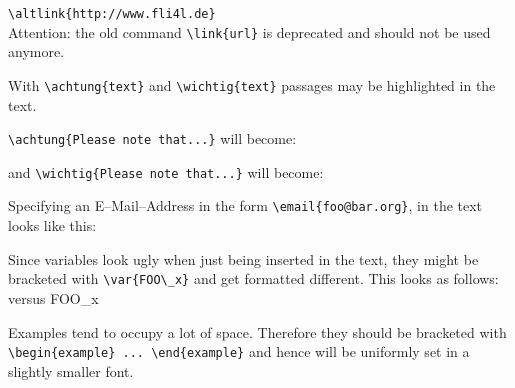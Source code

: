 \begin{description}
  \verb*?\altlink{http://www.fli4l.de}?\\
  Attention: the old command \verb*?\link{url}? is deprecated and
  should not be used anymore.

\item [achtung, wichtig] With \verb*?\achtung{text}? and
  \verb*?\wichtig{text}? passages may be highlighted in the text.

  \verb*?\achtung{Please note that...}? will become:


  and \verb*?\wichtig{Please note that...}? will become:


\item [email] Specifying an E--Mail--Address in the form
\verb*?\email{foo@bar.org}?, in the text looks like this:


\item [var] Since variables look ugly when just being inserted in the text, they
  might be bracketed with \verb*?\var{FOO\_x}? and get formatted different.
  This looks as follows:  versus FOO\_x

\item [example] Examples tend to occupy a lot of space. Therefore they
  should be bracketed with \verb*?\begin{example} ... \end{example}?
  and hence will be uniformly set in a slightly smaller font.
\end{description}

